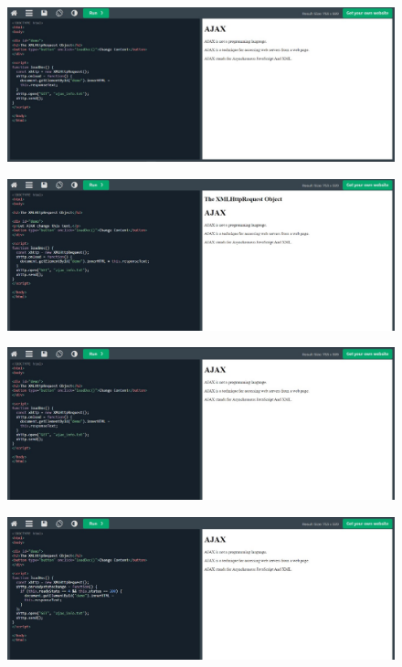 \documentclass{article}
\begin{document}
\begin{itemize}
		\begin{figure}[H]
			\centering
			\includegraphics[width=1.0\textwidth,keepaspectratio]{img/L1.jpg}
		\end{figure}
		\begin{figure}[H]
			\centering
			\includegraphics[width=1.0\textwidth,keepaspectratio]{img/L2.jpg}
		\end{figure}
		\begin{figure}[H]
			\centering
			\includegraphics[width=1.0\textwidth,keepaspectratio]{img/L3.jpg}
		\end{figure}
		\begin{figure}[H]
			\centering
			\includegraphics[width=1.0\textwidth,keepaspectratio]{img/L4.jpg}

\end{figure}
\end{itemize}
\end{document}
